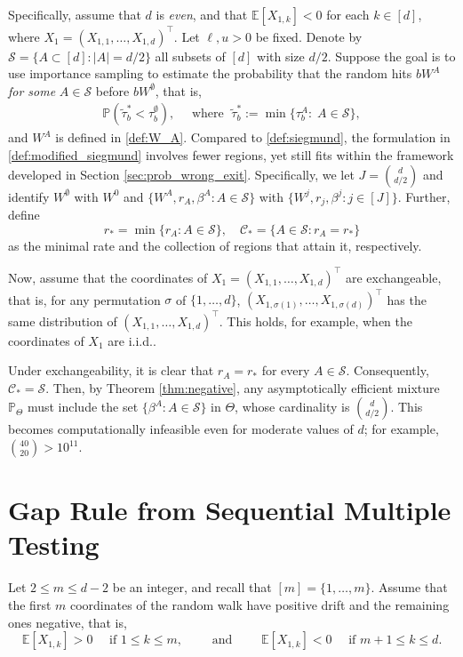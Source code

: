 \documentclass[aap,preprint]{imsart}
\newcommand{\Mstar}{[m]}
\newcommand{\Pro}{{\mathbb{P}}}
\newcommand{\Exp}{{\mathbb{E}}}
\theoremstyle{plain}
\theoremstyle{definition}
\begin{document}
Specifically, assume that $d$ is \emph{even}, and  that $\Exp[X_{1,k}] < 0$ for each $k \in [d]$, where $X_1 = (X_{1,1},\ldots,X_{1,d})^\top$. Let $\ell,u > 0$ be fixed. Denote by $\mathcal{S} = \{A \subset [d]: |A| = d/2\}$  all subsets of $[d]$ with size $d/2$. Suppose the goal is to use importance sampling to estimate the probability that the random hits 
$b W^{A}$ \textit{for some} $A \in \mathcal{S}$ before $b W^{\emptyset}$, that is,
\begin{align}
    \label{def:modified_siegmund}
    \Pro\left(\tilde{\tau}_b^{*} < \tau_b^{\emptyset} \right), \quad \text{ where } \; \tilde{\tau}_b^{*}:= \min\{\tau_b^{A}:\; A \in \mathcal{S}\},
\end{align}
and  $W^A$ is defined in  \eqref{def:W_A}. Compared to \eqref{def:siegmund}, the formulation in \eqref{def:modified_siegmund} involves fewer regions, yet still fits within the framework developed in Section \ref{sec:prob_wrong_exit}. Specifically, we let $J = \binom{d}{d/2}$ and identify $W^{\emptyset}$ with $W^{0}$ and $\{W^{A}, r_A, \beta^A:A \in \mathcal{S}\}$ with $\{W^j, r_j, \beta^j: j \in [J]\}$. Further, define
\[
r_* = \min\{r_A : A \in \mathcal{S}\}, \quad
\mathcal{C}_* = \{A \in \mathcal{S} : r_A = r_*\}
\]
as the minimal rate and the collection of regions that attain it, respectively.

Now, assume that the coordinates of $X_1 = (X_{1,1},\ldots,X_{1,d})^\top$ are exchangeable, that is, for any permutation $\sigma$ of $\{1,\ldots,d\}$, $(X_{1,\sigma(1)},\ldots,X_{1,\sigma(d)})^{\top}$ has the same distribution of $(X_{1,1},\ldots,X_{1,d})^\top$. This holds, for example, when the coordinates of $X_1$ are i.i.d..

Under exchangeability, it is clear that $r_A = r_*$ for every $A \in \mathcal{S}$. Consequently, $\mathcal{C}_* = \mathcal{S}$. Then, by Theorem \ref{thm:negative}, any asymptotically efficient mixture $\Pro_{\Theta}$ must include the set $\{\beta^A : A \in \mathcal{S}\}$ in $\Theta$, whose cardinality is $\binom{d}{d/2}$. This becomes computationally infeasible even for moderate values of $d$; for example, $\binom{40}{20} > 10^{11}$.
 

 



\section{Gap Rule from Sequential Multiple Testing}\label{sec:gap_rule}

Let $2 \leq m \leq d-2$ be an integer, and recall that $\Mstar = \{1,\ldots, m\}$. Assume that the first $m$ coordinates of the random walk have positive drift and the remaining ones negative, that is, 
$$
\Exp[X_{1,k}] > 0 \quad \text{ if } 1 \leq k \leq m, \qquad \text{ and } \qquad 
\Exp[X_{1,k}] < 0 \quad \text{ if } m+1 \leq k \leq d.
$$
\end{document}

